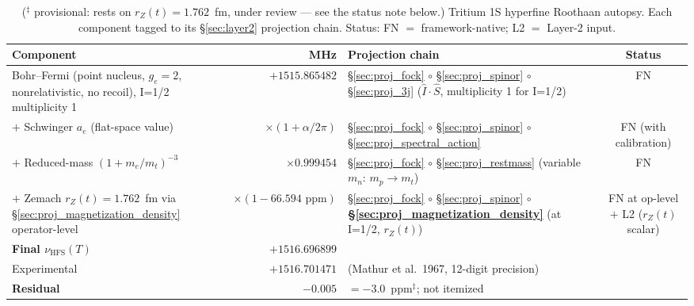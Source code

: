 \documentclass[11pt]{article}
\begin{document}
\begin{table}[h]
\centering\small
\begin{tabular}{p{4.5cm} r p{6cm} c}
\toprule
Component & MHz & Projection chain & Status \\
\midrule
Bohr--Fermi (point nucleus, $g_e=2$, nonrelativistic, no recoil), I=1/2
multiplicity 1 & $+1515.865482$ &
\S\ref{sec:proj_fock} $\circ$ \S\ref{sec:proj_spinor} $\circ$
\S\ref{sec:proj_3j} ($\hat{I}\cdot\hat{S}$, multiplicity 1 for I=1/2) & FN \\
$+$ Schwinger $a_e$ (flat-space value) &
$\times (1+\alpha/2\pi)$ &
\S\ref{sec:proj_fock} $\circ$ \S\ref{sec:proj_spinor} $\circ$
\S\ref{sec:proj_spectral_action} & FN (with calibration) \\
$+$ Reduced-mass $(1+m_e/m_t)^{-3}$ & $\times 0.999454$ &
\S\ref{sec:proj_fock} $\circ$ \S\ref{sec:proj_restmass} (variable
$m_n$: $m_p \to m_t$) & FN \\
$+$ Zemach $r_Z(t)=1.762$~fm via \S\ref{sec:proj_magnetization_density}
operator-level & $\times (1 - 66.594 \text{~ppm})$ &
\S\ref{sec:proj_fock} $\circ$ \S\ref{sec:proj_spinor} $\circ$
\textbf{\S\ref{sec:proj_magnetization_density}} (at I=1/2, $r_Z(t)$) & FN at op-level
$+$ L2 ($r_Z(t)$ scalar) \\
\midrule
\textbf{Final $\nu_\text{HFS}(T)$} & $+1516.696899$ & & \\
Experimental & $+1516.701471$ & (Mathur et al.\ 1967, 12-digit precision) & \\
\textbf{Residual} & $-0.005$ & $= -3.0$~ppm$^{\ddagger}$; not itemized & \\
\bottomrule
\end{tabular}
\caption{($^{\ddagger}$ provisional: rests on $r_Z(t) = 1.762$~fm, under review --- see the status note below.)  Tritium 1S hyperfine Roothaan autopsy.  Each component
tagged to its \S\ref{sec:layer2} projection chain. Status: FN $=$
framework-native; L2 $=$ Layer-2 input.}
\label{tab:autopsy_t_hfs}
\end{table}
\end{document}
